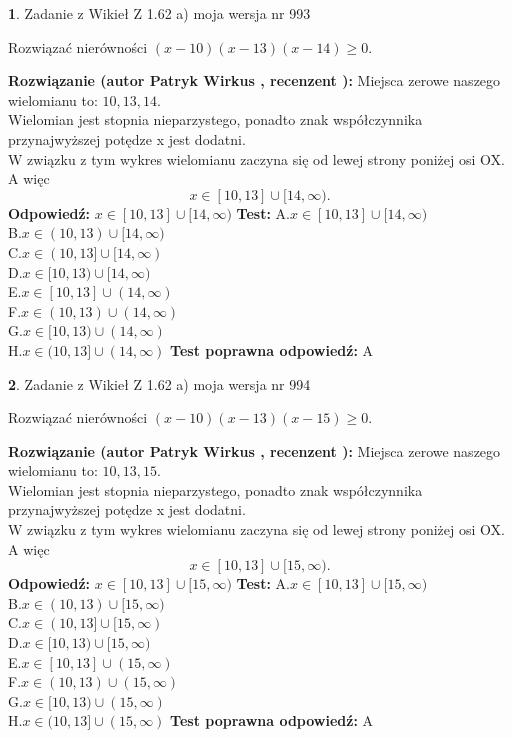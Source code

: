 \documentclass[12pt, a4paper]{article}
\theoremstyle{definition} %
\newtheorem{zad}{}
\newcommand{\zadStart}[1]{\begin{zad}#1\newline}
\newcommand{\zadStop}{\end{zad}}
\newcommand{\rozwStart}[2]{\noindent \textbf{Rozwiązanie (autor #1 , recenzent #2): }\newline}
\newcommand{\rozwStop}{\newline}
\newcommand{\odpStart}{\noindent \textbf{Odpowiedź:}\newline}
\newcommand{\odpStop}{\newline}
\newcommand{\testStart}{\noindent \textbf{Test:}\newline}
\newcommand{\testStop}{\newline}
\newcommand{\kluczStart}{\noindent \textbf{Test poprawna odpowiedź:}\newline}
\newcommand{\kluczStop}{\newline}
\begin{document}
\zadStart{Zadanie z Wikieł Z 1.62 a) moja wersja nr 993}

Rozwiązać nierówności $(x-10)(x-13)(x-14)\ge0$.
\zadStop
\rozwStart{Patryk Wirkus}{}
Miejsca zerowe naszego wielomianu to: $10, 13, 14$.\\
Wielomian jest stopnia nieparzystego, ponadto znak współczynnika przy\linebreak najwyższej potędze x jest dodatni.\\ W związku z tym wykres wielomianu zaczyna się od lewej strony poniżej osi OX. A więc $$x \in [10,13] \cup [14,\infty).$$
\rozwStop
\odpStart
$x \in [10,13] \cup [14,\infty)$
\odpStop
\testStart
A.$x \in [10,13] \cup [14,\infty)$\\
B.$x \in (10,13) \cup [14,\infty)$\\
C.$x \in (10,13] \cup [14,\infty)$\\
D.$x \in [10,13) \cup [14,\infty)$\\
E.$x \in [10,13] \cup (14,\infty)$\\
F.$x \in (10,13) \cup (14,\infty)$\\
G.$x \in [10,13) \cup (14,\infty)$\\
H.$x \in (10,13] \cup (14,\infty)$
\testStop
\kluczStart
A
\kluczStop



\zadStart{Zadanie z Wikieł Z 1.62 a) moja wersja nr 994}

Rozwiązać nierówności $(x-10)(x-13)(x-15)\ge0$.
\zadStop
\rozwStart{Patryk Wirkus}{}
Miejsca zerowe naszego wielomianu to: $10, 13, 15$.\\
Wielomian jest stopnia nieparzystego, ponadto znak współczynnika przy\linebreak najwyższej potędze x jest dodatni.\\ W związku z tym wykres wielomianu zaczyna się od lewej strony poniżej osi OX. A więc $$x \in [10,13] \cup [15,\infty).$$
\rozwStop
\odpStart
$x \in [10,13] \cup [15,\infty)$
\odpStop
\testStart
A.$x \in [10,13] \cup [15,\infty)$\\
B.$x \in (10,13) \cup [15,\infty)$\\
C.$x \in (10,13] \cup [15,\infty)$\\
D.$x \in [10,13) \cup [15,\infty)$\\
E.$x \in [10,13] \cup (15,\infty)$\\
F.$x \in (10,13) \cup (15,\infty)$\\
G.$x \in [10,13) \cup (15,\infty)$\\
H.$x \in (10,13] \cup (15,\infty)$
\testStop
\kluczStart
A
\kluczStop
\end{document}
